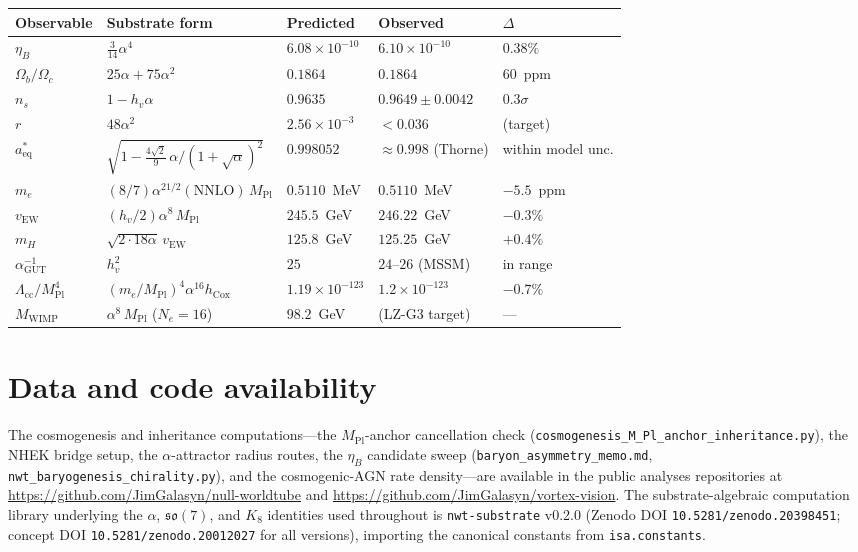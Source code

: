 \documentclass[11pt]{article}
\newcommand{\so}{\mathfrak{so}}
\newcommand{\HV}{h_v}
\newcommand{\hcox}{h_{\mathrm{Cox}}}
\newcommand{\Mpl}{M_{\mathrm{Pl}}}
\newcommand{\vEW}{v_{\mathrm{EW}}}
\newcommand{\Lcc}{\Lambda_{\mathrm{cc}}}
\begin{document}
\begin{center}
\begin{tabular}{lllll}
\toprule
Observable & Substrate form & Predicted & Observed & $\Delta$ \\
\midrule
$\eta_B$ & $\tfrac{3}{14}\alpha^4$ & $6.08\times10^{-10}$ & $6.10\times10^{-10}$ & $0.38\%$ \\
$\Omega_b/\Omega_c$ & $25\alpha + 75\alpha^2$ & $0.1864$ & $0.1864$ & $60$~ppm \\
$n_s$ & $1 - \HV\alpha$ & $0.9635$ & $0.9649 \pm 0.0042$ & $0.3\sigma$ \\
$r$ & $48\alpha^2$ & $2.56\times10^{-3}$ & $< 0.036$ & (target) \\
$a^*_{\mathrm{eq}}$ & $\sqrt{1 - \tfrac{4\sqrt{2}}{9}\,\alpha/(1+\sqrt{\alpha})^2}$ & $0.998052$ & $\approx 0.998$ (Thorne) & within model unc. \\
$m_e$ & $(8/7)\alpha^{21/2}(\text{NNLO})\,\Mpl$ & $0.5110$~MeV & $0.5110$~MeV & $-5.5$~ppm \\
$\vEW$ & $(\HV/2)\alpha^8\,\Mpl$ & $245.5$~GeV & $246.22$~GeV & $-0.3\%$ \\
$m_H$ & $\sqrt{2\cdot18\alpha}\,\vEW$ & $125.8$~GeV & $125.25$~GeV & $+0.4\%$ \\
$\alpha_{\mathrm{GUT}}^{-1}$ & $\HV^2$ & $25$ & $24$--$26$ (MSSM) & in range \\
$\Lcc/\Mpl^4$ & $(m_e/\Mpl)^4\alpha^{16}\hcox$ & $1.19\times10^{-123}$ & $1.2\times10^{-123}$ & $-0.7\%$ \\
$M_{\mathrm{WIMP}}$ & $\alpha^8\,\Mpl$ ($N_e = 16$) & $98.2$~GeV & (LZ-G3 target) & --- \\
\bottomrule
\end{tabular}
\end{center}

\section*{Data and code availability}

The cosmogenesis and inheritance computations---the $\Mpl$-anchor cancellation check (\texttt{cosmogenesis\_\allowbreak M\_\allowbreak Pl\_\allowbreak anchor\_\allowbreak inheritance.py}), the NHEK bridge setup, the $\alpha$-attractor radius routes, the $\eta_B$ candidate sweep (\texttt{baryon\_asymmetry\_memo.md}, \texttt{nwt\_baryogenesis\_chirality.py}), and the cosmogenic-AGN rate density---are available in the public analyses repositories at \url{https://github.com/JimGalasyn/null-worldtube} and \url{https://github.com/JimGalasyn/vortex-vision}. The substrate-algebraic computation library underlying the $\alpha$, $\so(7)$, and $K_8$ identities used throughout is \texttt{nwt-substrate} v0.2.0 (Zenodo DOI \texttt{10.5281/\allowbreak zenodo.20398451}; concept DOI \texttt{10.5281/\allowbreak zenodo.20012027} for all versions), importing the canonical constants from \texttt{isa.constants}.
\end{document}
